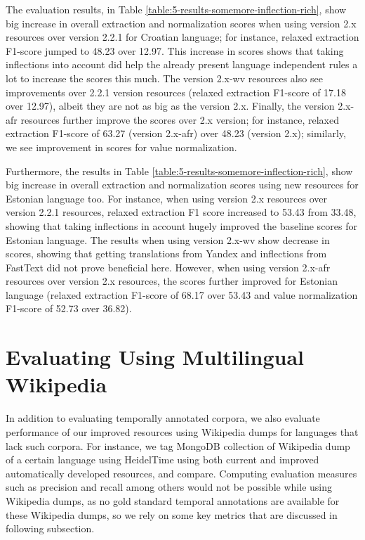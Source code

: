 The evaluation results, in Table \ref{table:5-results-somemore-inflection-rich}, show big increase in overall extraction and normalization scores when using version 2.x resources over version 2.2.1 for Croatian language; for instance, relaxed extraction F1-score jumped to 48.23 over 12.97. This increase in scores shows that taking inflections into account did help the already present language independent rules a lot to increase the scores this much. The version 2.x-wv resources also see improvements over 2.2.1 version resources (relaxed extraction F1-score of 17.18 over 12.97), albeit they are not as big as the version 2.x. Finally, the version 2.x-afr resources further improve the scores over 2.x version; for instance, relaxed extraction F1-score of 63.27 (version 2.x-afr) over 48.23 (version 2.x); similarly, we see improvement in scores for value normalization.

Furthermore, the results in Table \ref{table:5-results-somemore-inflection-rich}, show big increase in overall extraction and normalization scores using new resources for Estonian language too. For instance, when using version 2.x resources over version 2.2.1 resources, relaxed extraction F1 score increased to 53.43 from 33.48, showing that taking inflections in account hugely improved the baseline scores for Estonian language. The results when using version 2.x-wv show decrease in scores, showing that getting translations from Yandex and  inflections from FastText did not prove beneficial here. However, when using version 2.x-afr resources over version 2.x resources, the scores further improved for Estonian language (relaxed extraction F1-score of 68.17 over 53.43 and value normalization F1-score of 52.73 over 36.82). 



\section{Evaluating Using Multilingual Wikipedia}

In addition to evaluating temporally annotated corpora, we also evaluate performance of our improved resources using Wikipedia dumps for languages that lack such corpora. For instance, we tag MongoDB collection of Wikipedia dump of a certain language using HeidelTime using both current and improved automatically developed resources, and compare. Computing evaluation measures such as precision and recall among others would not be possible while using Wikipedia dumps, as no gold standard temporal annotations are available for these Wikipedia dumps, so we rely on some key metrics that are discussed in following subsection.

